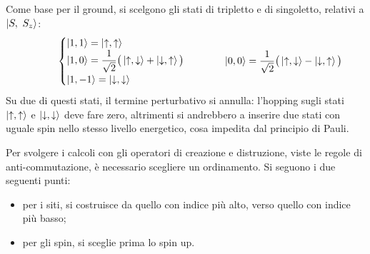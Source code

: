 \documentclass[11pt, a4paper]{scrartcl}
\theoremstyle{style}
\theoremstyle{style1}
\newenvironment{boxenv}[1][]{
    \begin{eqbox}[#1]
    }{
   \end{eqbox}
}
\numberwithin{equation}{subsection}
\begin{document}
Come base per il ground, si scelgono gli stati di tripletto e di singoletto, relativi a $\ket{S,\ S_z} $:
\[
\hspace{1cm}\begin{cases}
	\ket{1,1} = \ket{\uparrow, \uparrow} \\
	\ket{1,0} = \displaystyle \frac{1}{\sqrt{2} } \big(\ket{\uparrow,\downarrow} + \ket{\downarrow,\uparrow} \big) \\
	\ket{1,-1} = \ket{\downarrow,\downarrow} 
\end{cases} \hspace{1cm} \ket{0,0} = \frac{1}{\sqrt{2} } \big(\ket{\uparrow,\downarrow} - \ket{\downarrow,\uparrow} \big) 
\] 
Su due di questi stati, il termine perturbativo si annulla: l'hopping sugli stati $\ket{\uparrow,\uparrow} $ e $\ket{\downarrow,\downarrow} $ deve fare zero, altrimenti si andrebbero a inserire due stati con uguale spin nello stesso livello energetico, cosa impedita dal principio di Pauli.
\begin{boxenv}[]
Per svolgere i calcoli con gli operatori di creazione e distruzione, viste le regole di anti-commutazione, \`e necessario scegliere un ordinamento. Si seguono i due seguenti punti:
\begin{itemize}
	\item per i siti, si costruisce da quello con indice pi\`u alto, verso quello con indice pi\`u basso;
	\item per gli spin, si sceglie prima lo spin up.
\end{itemize}
\end{boxenv}
\end{document}
